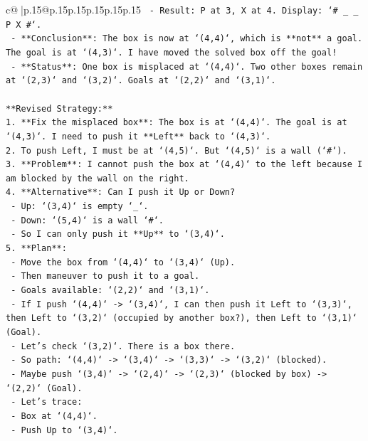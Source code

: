 \documentclass{article}
\begin{document}
{\begin{supertabular}{c@{$\;$}|p{.15\linewidth}@{}p{.15\linewidth}p{.15\linewidth}p{.15\linewidth}p{.15\linewidth}p{.15\linewidth}}
{{{\texttt{        {-} Result: P at 3, X at 4. Display: `\# \_ \_ P X \#`.} \\
\texttt{        {-} **Conclusion**: The box is now at `(4,4)`, which is **not** a goal. The goal is at `(4,3)`. I have moved the solved box off the goal!} \\
\texttt{        {-} **Status**: One box is misplaced at `(4,4)`. Two other boxes remain at `(2,3)` and `(3,2)`. Goals at `(2,2)` and `(3,1)`.} \\
\\ 
\texttt{**Revised Strategy:**} \\
\texttt{1.  **Fix the misplaced box**: The box is at `(4,4)`. The goal is at `(4,3)`. I need to push it **Left** back to `(4,3)`.} \\
\texttt{2.  To push Left, I must be at `(4,5)`. But `(4,5)` is a wall (`\#`).} \\
\texttt{3.  **Problem**: I cannot push the box at `(4,4)` to the left because I am blocked by the wall on the right.} \\
\texttt{4.  **Alternative**: Can I push it Up or Down?} \\
\texttt{    {-} Up: `(3,4)` is empty `\_`.} \\
\texttt{    {-} Down: `(5,4)` is a wall `\#`.} \\
\texttt{    {-} So I can only push it **Up** to `(3,4)`.} \\
\texttt{5.  **Plan**:} \\
\texttt{    {-} Move the box from `(4,4)` to `(3,4)` (Up).} \\
\texttt{    {-} Then maneuver to push it to a goal.} \\
\texttt{    {-} Goals available: `(2,2)` and `(3,1)`.} \\
\texttt{    {-} If I push `(4,4)` {-}> `(3,4)`, I can then push it Left to `(3,3)`, then Left to `(3,2)` (occupied by another box?), then Left to `(3,1)` (Goal).} \\
\texttt{    {-} Let's check `(3,2)`. There is a box there.} \\
\texttt{    {-} So path: `(4,4)` {-}> `(3,4)` {-}> `(3,3)` {-}> `(3,2)` (blocked).} \\
\texttt{    {-} Maybe push `(3,4)` {-}> `(2,4)` {-}> `(2,3)` (blocked by box) {-}> `(2,2)` (Goal).} \\
\texttt{    {-} Let's trace:} \\
\texttt{      {-} Box at `(4,4)`.} \\
\texttt{      {-} Push Up to `(3,4)`.} \\
}}}
\end{supertabular}}
\end{document}
